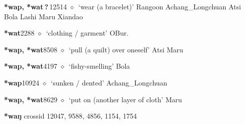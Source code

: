   \begin{list}{}{\leftmargin=1.5em \itemindent=-1.5em}
  \item {\footnotesize \textbf{*wap, *wat\,?\,}}{\tiny 12514}
         $\diamond$~`wear (a bracelet)'
         Rangoon 
\hspace{1ex}
         Achang\_Longchuan 
\hspace{1ex}
         Atsi 
\hspace{1ex}
         Bola 
\hspace{1ex}
         Lashi 
\hspace{1ex}
         Maru 
\hspace{1ex}
         Xiandao 
  \item {\footnotesize \textbf{*wat}}{\tiny 2288}
\hspace{1ex}
         $\diamond$~`clothing / garment'
         OBur. 
  \item {\footnotesize \textbf{*wap, *wat}}{\tiny 8508}
\hspace{1ex}
         $\diamond$~`pull (a quilt) over oneself'
         Atsi 
\hspace{1ex}
         Maru 
  \item {\footnotesize \textbf{*wap, *wat}}{\tiny 4197}
\hspace{1ex}
         $\diamond$~`fishy-smelling'
         Bola 
  \item {\footnotesize \textbf{*wap}}{\tiny 10924}
\hspace{1ex}
         $\diamond$~`sunken / dented'
         Achang\_Longchuan 
  \item {\footnotesize \textbf{*wap, *wat}}{\tiny 8629}
\hspace{1ex}
         $\diamond$~`put on (another layer of cloth'
         Maru 
  \end{list}
\item
\textbf{*waŋ}
  {\tiny crossid 12047, 9588, 4856, 1154, 1754}
